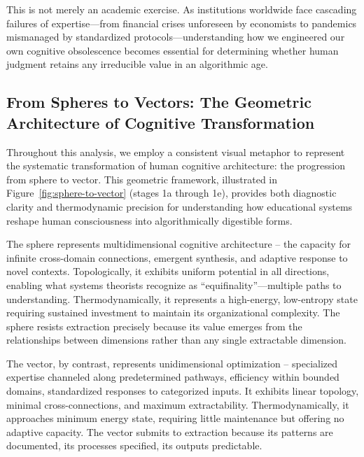 This is not merely an academic exercise. As institutions worldwide face cascading failures of expertise---from financial crises unforeseen by economists to pandemics mismanaged by standardized protocols---understanding how we engineered our own cognitive obsolescence becomes essential for determining whether human judgment retains any irreducible value in an algorithmic age.

\subsection{From Spheres to Vectors: The Geometric Architecture of Cognitive Transformation}

Throughout this analysis, we employ a consistent visual metaphor to represent the systematic transformation of human cognitive architecture: the progression from sphere to vector. This geometric framework, illustrated in Figure~\ref{fig:sphere-to-vector} (stages 1a through 1e), provides both diagnostic clarity and thermodynamic precision for understanding how educational systems reshape human consciousness into algorithmically digestible forms.

The sphere represents multidimensional cognitive architecture – the capacity for infinite cross-domain connections, emergent synthesis, and adaptive response to novel contexts. Topologically, it exhibits uniform potential in all directions, enabling what systems theorists recognize as ``equifinality''---multiple paths to understanding. Thermodynamically, it represents a high-energy, low-entropy state requiring sustained investment to maintain its organizational complexity. The sphere resists extraction precisely because its value emerges from the relationships between dimensions rather than any single extractable dimension.

The vector, by contrast, represents unidimensional optimization – specialized expertise channeled along predetermined pathways, efficiency within bounded domains, standardized responses to categorized inputs. It exhibits linear topology, minimal cross-connections, and maximum extractability. Thermodynamically, it approaches minimum energy state, requiring little maintenance but offering no adaptive capacity. The vector submits to extraction because its patterns are documented, its processes specified, its outputs predictable.

